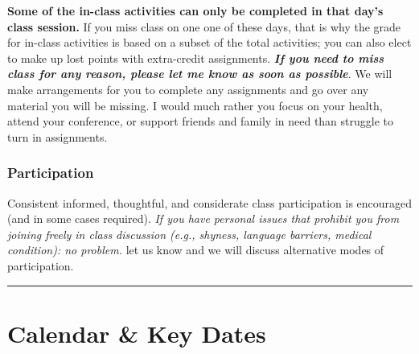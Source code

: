 \documentclass[
  10pt,
  letterpaper,
  oneside,
  open=any]{scrbook}
\begin{document}
\textbf{Some of the in-class activities can only be completed in that
day's class session.} If you miss class on one one of these days, that
is why the grade for in-class activities is based on a subset of the
total activities; you can also elect to make up lost points with
extra-credit assignments. \textbf{\emph{If you need to miss class for
any reason, please let me know as soon as possible}}. We will make
arrangements for you to complete any assignments and go over any
material you will be missing. I would much rather you focus on your
health, attend your conference, or support friends and family in need
than struggle to turn in assignments.

\subsection*{Participation}\label{participation}

Consistent informed, thoughtful, and considerate class participation is
encouraged (and in some cases required). \emph{If you have personal
issues that prohibit you from joining freely in class discussion (e.g.,
shyness, language barriers, medical condition): no problem.} let us know
and we will discuss alternative modes of participation.

\begin{center}\rule{0.5\linewidth}{0.5pt}\end{center}


\chapter{Calendar \& Key Dates}\label{calendar-key-dates}

\begingroup\fontsize{9}{11}\selectfont
\end{document}
